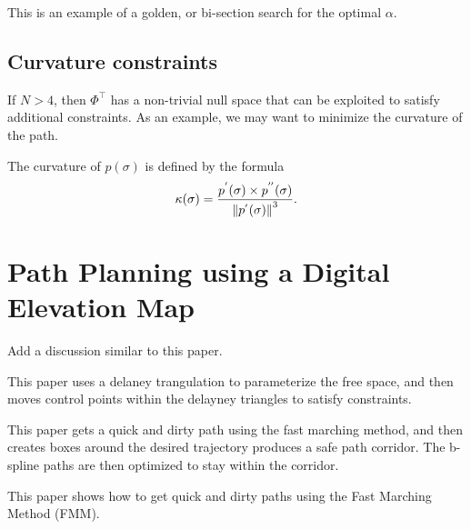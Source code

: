 This is an example of a golden, or bi-section search for the optimal $\alpha$.
    


\subsection{Curvature constraints}


If $N>4$, then $\Phi^\top$ has a non-trivial null space that can be exploited to satisfy additional constraints.  As an example, we may want to minimize the curvature of the path.  

The curvature of $p(\sigma)$ is defined by the formula
\[
\kappa(\sigma) = \frac{p^{'}(\sigma)\times p^{''}(\sigma)}{\left\|p^{'}(\sigma)\right\|^3}.
\]


%


\section{Path Planning using a Digital Elevation Map}

Add a discussion similar to this paper.

This paper uses a delaney trangulation to parameterize the free space, and then moves control points within the delayney triangles to satisfy constraints.



This paper gets a quick and dirty path using the fast marching method, and then creates boxes around the desired trajectory produces a safe path corridor.  The b-spline paths are then optimized to stay within the corridor.



This paper shows how to get quick and dirty paths using the Fast Marching Method (FMM).






